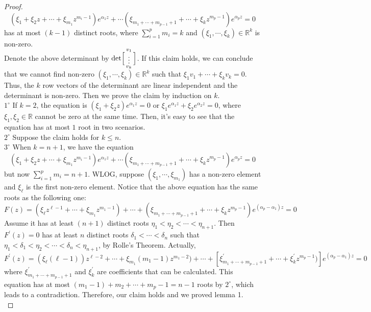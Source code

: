 \begin{proof}
$$(\xi_{1}+\xi_{2}z+\cdots+\xi_{m_1}z^{m_{i}-1})e^{\alpha_{1}z}+\cdots(\xi_{m_{1}+\cdots+m_{p-1}+1}+\cdots+\xi_{k}z^{m_{p}-1})e^{\alpha_{p}z}=0$$ has at most $(k-1)$ distinct roots, where $\sum_{i=1}^{p}m_i=k$ and $(\xi_{1},\cdots,\xi_{k})\in\mathbb{R}^{k}$ is non-zero.\\
Denote the above determinant by $\det\Bigl[\begin{smallmatrix} v_{1}\\\vdots\\ v_{k} \end{smallmatrix}\Bigr]$. If this claim holds, we can conclude that we cannot find non-zero $(\xi_{1},\cdots,\xi_{k})\in\mathbb{R}^{k}$ such that $\xi_{1}v_{1}+\cdots+\xi_{k}v_{k}=0$. Thus, the $k$ row vectors of the determinant are linear independent and the determinant is non-zero. Then we prove the claim by induction on $k$.\\
$1^{\circ}$ If $k=2$, the equation is $(\xi_{1}+\xi_{2}z)e^{\alpha_{1}z}=0$ or $\xi_{1}e^{\alpha_{1}z}+\xi_{2}e^{\alpha_{2}z}=0$, where $\xi_{1},\xi_{2}\in\mathbb{R}$ cannot be zero at the same time. Then, it's easy to see that the equation has at most $1$ root in two scenarios.\\
$2^{\circ}$ Suppose the claim holds for $k\leqslant n$.\\
$3^{\circ}$ When $k=n+1$, we have the equation $$(\xi_{1}+\xi_{2}z+\cdots+\xi_{m_1}z^{m_{i}-1})e^{\alpha_{1}z}+\cdots(\xi_{m_{1}+\cdots+m_{p-1}+1}+\cdots+\xi_{k}z^{m_{p}-1})e^{\alpha_{p}z}=0$$ but now $\sum_{i=1}^{p}m_{i}=n+1$. WLOG, suppose $(\xi_{1},\cdots,\xi_{m_{1}})$ has a non-zero element and $\xi_{\ell}$ is the first non-zero element. Notice that the above equation has the same roots as the following one:
$$F(z)=(\xi_{\ell}z^{\ell-1}+\cdots+\xi_{m_1}z^{m_1-1})+\cdots+(\xi_{m_1+\cdots+m_{p-1}+1}+\cdots+\xi_{k}z^{m_{p}-1})e^{(\alpha_{p}-\alpha_{1})z}=0$$
Assume it has at least $(n+1)$ distinct roots $\eta_{1}<\eta_{2}<\cdots<\eta_{n+1}$. Then $F^{\prime}(z)=0$ has at least $n$ distinct roots $\delta_{1}<\cdots<\delta_{n}$ such that $\eta_{1}<\delta_{1}<\eta_{2}<\cdots<\delta_{n}<\eta_{n+1}$, by Rolle's Theorem. Actually, $F^{\prime}(z)=(\xi_{\ell}(\ell-1))z^{\ell-2}+\cdots+\xi_{m_1}(m_1-1)z^{m_{1}-2})+\cdots+[\xi_{m_1+\cdots+m_{p-1}+1}^{\prime}+\cdots+\xi_{k}^{\prime}z^{m_{p}-1})]e^{(\alpha_{p}-\alpha_{1})z}=0$
where $\xi_{m_1+\cdots+m_{p-1}+1}^{\prime}$ and $\xi_{k}^{\prime}$ are coefficients that can be calculated. This equation has at most $(m_1-1)+m_2+\cdots+m_{p}-1=n-1$ roots by $2^{\circ}$, which leads to a contradiction. Therefore, our claim holds and we proved lemma 1.\\

\end{proof}
